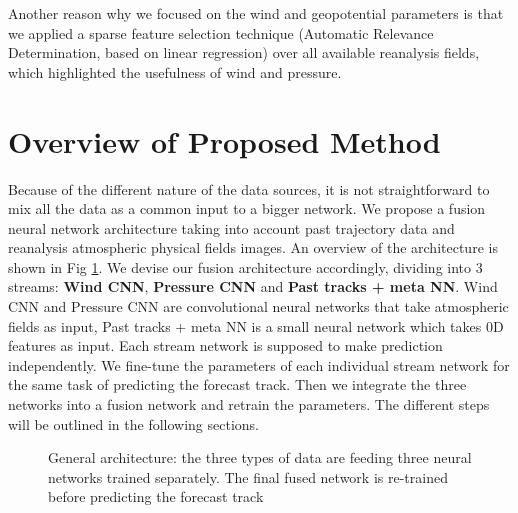  Another reason why we focused on the wind and geopotential parameters is that we applied a sparse feature selection technique (Automatic Relevance Determination, based on linear regression) over all available reanalysis fields, which highlighted the usefulness of wind and pressure.

\section{Overview of Proposed Method}

Because of the different nature of the data sources, it is not straightforward to mix all the data as a common input to a bigger network. We propose a fusion neural network architecture taking into account past trajectory data and reanalysis atmospheric physical fields images. An overview of the architecture is shown in Fig \ref{fig:fusion_arch}. We devise our fusion architecture accordingly, dividing into 3 streams: \textbf{Wind CNN}, \textbf{Pressure CNN} and \textbf{Past tracks + meta NN}. Wind CNN and Pressure CNN are convolutional neural networks that take atmospheric fields as input, Past tracks + meta NN is a small neural network which takes 0D features as input. Each stream network is supposed to make prediction independently. We fine-tune the parameters of each individual stream network for the same task of predicting the forecast track. Then we integrate the three networks into a fusion network and retrain the parameters. The different steps will be outlined in the following sections.



\begin{figure} 
	\begin{center}
		\hsize {}
	\end{center}
	\caption{General architecture: the three types of data are feeding three neural networks trained separately. The final fused network is re-trained before predicting the forecast track}
	\label{fig:fusion_arch}
\end{figure}

